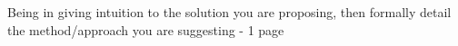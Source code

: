 Being in giving intuition to the solution you are proposing, then formally detail the method/approach you are suggesting -  1 page